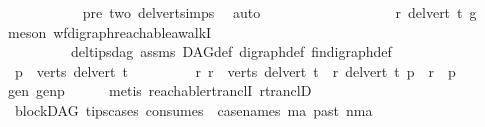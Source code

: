 \begin{isabellebody}
\ \ \ \ \ \ \ \ \ \ \isamarkupfalse%
\ pre\ two\ del{\isacharunderscore}{\kern0pt}vert{\isacharunderscore}{\kern0pt}simps{\isacharparenleft}{\kern0pt}{}{\isacharparenright}{\kern0pt}\ \isamarkupfalse%
\ auto\isanewline
\ \ \ \ \ \ \isamarkupfalse%
\isanewline
\ \ \ \ \isamarkupfalse%
\isanewline
\ \ \ \ \isamarkupfalse%
\ \isamarkupfalse%
\ {\isachardoublequoteopen}r\ {\isasymrightarrow}\isactrlsup {\isacharasterisk}{\kern0pt}\isactrlbsub del{\isacharunderscore}{\kern0pt}vert\ t\isactrlesub \ g{\isachardoublequoteclose}\ \isamarkupfalse%
\ {\isacharparenleft}{\kern0pt}meson\ wf{\isacharunderscore}{\kern0pt}digraph{\isachardot}{\kern0pt}reachable{\isacharunderscore}{\kern0pt}awalkI\ \ \isanewline
\ \ \ \ \ \ \ \ \ \ del{\isacharunderscore}{\kern0pt}tips{\isacharunderscore}{\kern0pt}dag\ assms{\isacharparenleft}{\kern0pt}{}{\isacharparenright}{\kern0pt}\ DAG{\isacharunderscore}{\kern0pt}def\ digraph{\isacharunderscore}{\kern0pt}def\ fin{\isacharunderscore}{\kern0pt}digraph{\isacharunderscore}{\kern0pt}def{\isacharparenright}{\kern0pt}\isanewline
\ \ \isamarkupfalse%
\isanewline
\ \ \isamarkupfalse%
\ \isamarkupfalse%
\ {\isachardoublequoteopen}\ {\isasymexists}p\ {\isasymin}\ verts\ {\isacharparenleft}{\kern0pt}del{\isacharunderscore}{\kern0pt}vert\ t{\isacharparenright}{\kern0pt}\ {\isachardot}{\kern0pt}\isanewline
\ \ \ \ \ \ \ \ {\isacharparenleft}{\kern0pt}{\isasymforall}r{\isachardot}{\kern0pt}\ r\ {\isasymin}\ verts\ {\isacharparenleft}{\kern0pt}del{\isacharunderscore}{\kern0pt}vert\ t{\isacharparenright}{\kern0pt}\ {\isasymlongrightarrow}\ {\isacharparenleft}{\kern0pt}r\ {\isasymrightarrow}\isactrlsup {\isacharplus}{\kern0pt}\isactrlbsub del{\isacharunderscore}{\kern0pt}vert\ t\isactrlesub \ p\ {\isasymor}\ r\ {\isacharequal}{\kern0pt}\ p{\isacharparenright}{\kern0pt}{\isacharparenright}{\kern0pt}{\isachardoublequoteclose}\isanewline
\ \ \ \ \isamarkupfalse%
\ gen\ genp\isanewline
\ \ \ \ \isamarkupfalse%
\ {\isacharparenleft}{\kern0pt}metis\ reachable{\isacharunderscore}{\kern0pt}rtranclI\ rtranclD{\isacharparenright}{\kern0pt}\ \isanewline
{}\isamarkupfalse%
%
\endisatagproof
{\isafoldproof}%
%
\isadelimproof
\isanewline
%
\endisadelimproof
\isanewline
\isanewline
{}\isamarkupfalse%
\ {\isacharparenleft}{\kern0pt}\ blockDAG{\isacharparenright}{\kern0pt}\ tips{\isacharunderscore}{\kern0pt}cases\ {\isacharbrackleft}{\kern0pt}consumes\ {}{\isacharcomma}{\kern0pt}\ case{\isacharunderscore}{\kern0pt}names\ ma\ past\ nma{\isacharbrackright}{\kern0pt}{\isacharcolon}{\kern0pt}\isanewline

\end{isabellebody}
